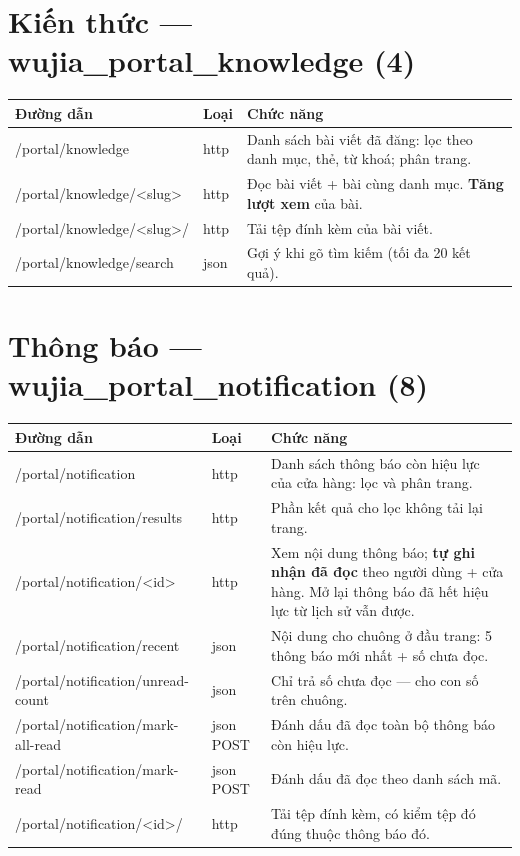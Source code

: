 \documentclass[11pt,a4paper]{report}
\newcommand{\rt}[1]{{\ttfamily\footnotesize #1}}
\begin{document}
\section{Kiến thức --- \rt{wujia\_portal\_knowledge} (4)}

{\small
\begin{longtable}{@{}L{5.4cm}L{1.5cm}L{7.5cm}@{}}
\toprule
\textbf{Đường dẫn} & \textbf{Loại} & \textbf{Chức năng} \\
\midrule
\endhead
\rt{/portal/knowledge} & http & Danh sách bài viết đã đăng: lọc theo danh mục, thẻ, từ khoá; phân trang. \\
\rt{/portal/knowledge/<slug>} & http & Đọc bài viết + bài cùng danh mục. \textbf{Tăng lượt xem} của bài. \\
\rt{/portal/knowledge/<slug>/}\allowbreak\rt{attachment/<id>} & http & Tải tệp đính kèm của bài viết. \\
\rt{/portal/knowledge/search} & json & Gợi ý khi gõ tìm kiếm (tối đa 20 kết quả). \\
\bottomrule
\end{longtable}}

\section{Thông báo --- \rt{wujia\_portal\_notification} (8)}

{\small
\begin{longtable}{@{}L{5.4cm}L{1.5cm}L{7.5cm}@{}}
\toprule
\textbf{Đường dẫn} & \textbf{Loại} & \textbf{Chức năng} \\
\midrule
\endhead
\rt{/portal/notification} & http & Danh sách thông báo còn hiệu lực của cửa hàng: lọc và phân trang. \\
\rt{/portal/notification/results} & http & Phần kết quả cho lọc không tải lại trang. \\
\rt{/portal/notification/<id>} & http & Xem nội dung thông báo; \textbf{tự ghi nhận đã đọc} theo người dùng + cửa hàng. Mở lại thông báo đã hết hiệu lực từ lịch sử vẫn được. \\
\rt{/portal/notification/recent} & json & Nội dung cho chuông ở đầu trang: 5 thông báo mới nhất + số chưa đọc. \\
\rt{/portal/notification/unread-count} & json & Chỉ trả số chưa đọc — cho con số trên chuông. \\
\rt{/portal/notification/mark-all-read} & json POST & Đánh dấu đã đọc toàn bộ thông báo còn hiệu lực. \\
\rt{/portal/notification/mark-read} & json POST & Đánh dấu đã đọc theo danh sách mã. \\
\rt{/portal/notification/<id>/}\allowbreak\rt{attachment/<id>} & http & Tải tệp đính kèm, có kiểm tệp đó đúng thuộc thông báo đó. \\
\bottomrule
\end{longtable}}
\end{document}
